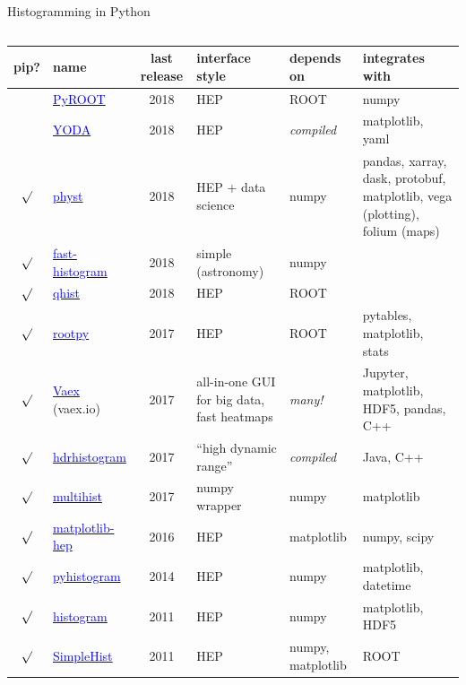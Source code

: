\documentclass[aspectratio=169]{beamer}
\begin{document}
\begin{frame}{Histogramming in Python}
\scriptsize
\vspace{0.25 cm}
\begin{columns}
\renewcommand{\arraystretch}{1.2}
\begin{tabular}{c l c p{2.7 cm} p{1.5 cm} p{4.75 cm}}
pip? & name & last release & interface style & depends on & integrates with \\\hline
& \href{https://root.cern.ch/pyroot}{\textcolor{blue}{PyROOT}} & 2018 & HEP & ROOT & numpy \\
& \href{https://yoda.hepforge.org/pydoc}{\textcolor{blue}{YODA}} & 2018 & HEP & {\it compiled} & matplotlib, yaml \\
$\surd$ & \href{https://pypi.python.org/pypi/physt}{\textcolor{blue}{physt}} & 2018 & HEP + data science & numpy & pandas, xarray, dask, protobuf, matplotlib, vega (plotting), folium (maps) \\
$\surd$ & \href{https://pypi.org/project/fast-histogram}{\textcolor{blue}{fast-histogram}} & 2018 & simple (astronomy) & numpy & \\
$\surd$ & \href{https://pypi.org/project/qhist/}{\textcolor{blue}{qhist}} & 2018 & HEP & ROOT & \\
$\surd$ & \href{https://pypi.org/project/rootpy}{\textcolor{blue}{rootpy}} & 2017 & HEP & ROOT & pytables, matplotlib, stats \\
$\surd$ & \href{https://vaex.io}{\textcolor{blue}{Vaex}} (vaex.io) & 2017 & all-in-one GUI for big data, fast heatmaps & {\it many!} & Jupyter, matplotlib, HDF5, pandas, C++ \\
$\surd$ & \href{https://pypi.python.org/pypi/hdrhistogram}{\textcolor{blue}{hdrhistogram}} & 2017 & ``high dynamic range'' & {\it compiled} & Java, C++ \\
$\surd$ & \href{https://pypi.python.org/pypi/multihist}{\textcolor{blue}{multihist}} & 2017 & numpy wrapper & numpy & matplotlib \\
$\surd$ & \href{https://github.com/ibab/matplotlib-hep}{\textcolor{blue}{matplotlib-hep}} & 2016 & HEP & matplotlib & numpy, scipy \\
$\surd$ & \href{https://pypi.python.org/pypi/pyhistogram}{\textcolor{blue}{pyhistogram}} & 2014 & HEP & numpy & matplotlib, datetime \\
$\surd$ & \href{https://pypi.python.org/pypi/histogram}{\textcolor{blue}{histogram}} & 2011 & HEP & numpy & matplotlib, HDF5 \\
$\surd$ & \href{https://pypi.python.org/pypi/SimpleHist}{\textcolor{blue}{SimpleHist}} & 2011 & HEP & numpy, matplotlib & ROOT \\

\end{tabular}
\end{columns}
\end{frame}
\end{document}
